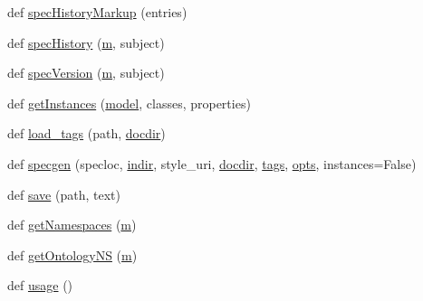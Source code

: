 \begin{DoxyCompactItemize}
\item 
def \hyperlink{namespacelv2specgen_a4396535eeb2bb23073b33aab604633c8}{spec\+History\+Markup} (entries)
\item 
def \hyperlink{namespacelv2specgen_a9b32677be9a74abc0dfce76cf6e83616}{spec\+History} (\hyperlink{layer3_8c_a4b8bfe70f28d6faddcb10d6ecf8c1989}{m}, subject)
\item 
def \hyperlink{namespacelv2specgen_ac862687e0b90dede349cbe9bb5bce270}{spec\+Version} (\hyperlink{layer3_8c_a4b8bfe70f28d6faddcb10d6ecf8c1989}{m}, subject)
\item 
def \hyperlink{namespacelv2specgen_a2bec2ae454dfa1de6f286a09d5b504e4}{get\+Instances} (\hyperlink{lib_2expat_8h_ac517f0c27408fbd365e7dd34e032faca}{model}, classes, properties)
\item 
def \hyperlink{namespacelv2specgen_aedcf1cae4846bf22b748efe77965f5e3}{load\+\_\+tags} (path, \hyperlink{namespacelv2specgen_a00e6923126250f5f2581f2e5776009de}{docdir})
\item 
def \hyperlink{namespacelv2specgen_a900e375ba15c9f0f93e7837f746b689c}{specgen} (specloc, \hyperlink{namespacelv2specgen_afced2c0f6d1b740f15b5645236267468}{indir}, style\+\_\+uri, \hyperlink{namespacelv2specgen_a00e6923126250f5f2581f2e5776009de}{docdir}, \hyperlink{namespacelv2specgen_af2d57abb8725f566629ed73846808438}{tags}, \hyperlink{namespacelv2specgen_a3418d48f73144afbd9db69c0c1aaf6b8}{opts}, instances=False)
\item 
def \hyperlink{namespacelv2specgen_a48dde971c2566b120b69361649cda47c}{save} (path, text)
\item 
def \hyperlink{namespacelv2specgen_a57667b418246acf10a28ecede0d839bf}{get\+Namespaces} (\hyperlink{layer3_8c_a4b8bfe70f28d6faddcb10d6ecf8c1989}{m})
\item 
def \hyperlink{namespacelv2specgen_a807b5e4b7d9dc123e892d8c64f6e861b}{get\+Ontology\+NS} (\hyperlink{layer3_8c_a4b8bfe70f28d6faddcb10d6ecf8c1989}{m})
\item 
def \hyperlink{namespacelv2specgen_a784d3ed7785c9bbbabc2c17fb7b0c9b1}{usage} ()
\end{DoxyCompactItemize}

